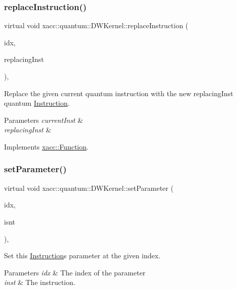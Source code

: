 \subsubsection{\texorpdfstring{replace\+Instruction()}{replaceInstruction()}}
{\footnotesize\ttfamily virtual void xacc\+::quantum\+::\+D\+W\+Kernel\+::replace\+Instruction (\begin{DoxyParamCaption}\item[{const int}]{idx,  }\item[{Inst\+Ptr}]{replacing\+Inst }\end{DoxyParamCaption})\hspace{0.3cm}{\ttfamily [inline]}, {\ttfamily [virtual]}}

Replace the given current quantum instruction with the new replacing\+Inst quantum \hyperlink{a01155}{Instruction}.


\begin{DoxyParams}{Parameters}
{\em current\+Inst} & \\
\hline
{\em replacing\+Inst} & \\
\hline
\end{DoxyParams}


Implements \hyperlink{a01151_a2ef6a4923a6734f90f6ee3d94d263af0}{xacc\+::\+Function}.

\mbox{\label{a00983_adf89cdd1f54e183c4cff36b338b2be8d}} 
\subsubsection{\texorpdfstring{set\+Parameter()}{setParameter()}}
{\footnotesize\ttfamily virtual void xacc\+::quantum\+::\+D\+W\+Kernel\+::set\+Parameter (\begin{DoxyParamCaption}\item[{const int}]{idx,  }\item[{Instruction\+Parameter \&}]{isnt }\end{DoxyParamCaption})\hspace{0.3cm}{\ttfamily [inline]}, {\ttfamily [virtual]}}

Set this \hyperlink{a01155}{Instruction}\textquotesingle{}s parameter at the given index.


\begin{DoxyParams}{Parameters}
{\em idx} & The index of the parameter \\
\hline
{\em inst} & The instruction. \\
\hline
\end{DoxyParams}


